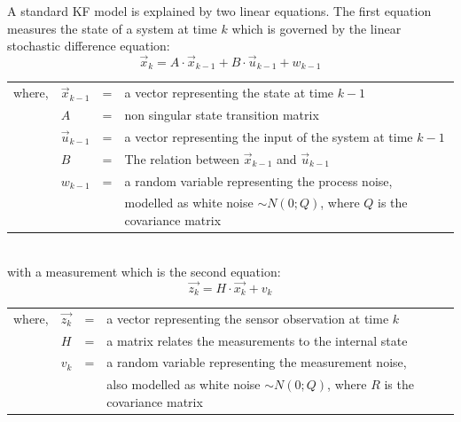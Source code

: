 A standard KF model is explained by two linear equations\cite{Wilfried2002}. The first equation measures the state of a system at time $k$ which is governed by the linear stochastic difference equation\cite{aich2010study}:
$$\vec{x}_{k} = A \cdot \vec{x}_{k-1} + B \cdot \vec{u}_{k-1} + w_{k-1}$$
\begin{table}[!htbp]
\centering
\label{my-label}
\begin{tabular}{llll}
where, & $\vec{x}_{k-1}$     & = & a vector representing the state at time $k-1$                                                                                                                                         \\
       & $A$       & = & non singular state transition matrix                                                                                                                                                  \\
       & $\vec{u}_{k-1}$     & = & a vector representing the input of the system at time $k-1$                                                                                                                           \\
       & $B$       & = & The relation between $\vec{x}_{k-1}$ and $\vec{u}_{k-1}$                                                                                                                                                  \\
       & $w_{k-1}$ & = & a random variable representing the process noise, \\
       &        & & modelled as white noise $\sim N(0; Q)$, where $Q$ is the covariance matrix
\end{tabular}
\end{table}\\
with a measurement which is the second equation\cite{aich2010study}:
$$\vec{z_{k}} = H \cdot \vec{x_{k}} + v_{k} $$
\begin{table}[!htbp]
\centering
\label{my-label}
\begin{tabular}{llll}
where, & $\vec{z_{k}}$     & = & a vector representing the sensor observation at time $k$                                                                                                                                         \\
       & $H$       & = & a matrix relates the measurements to the internal state                                                                                                                                            \\
       & $v_{k}$ & = & a random variable representing the measurement noise, \\
       &        & & also modelled as white noise $\sim N(0; Q)$, where $R$ is the covariance matrix
\end{tabular}
\end{table}

